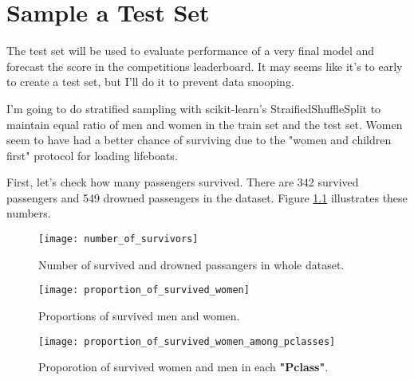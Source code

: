 \chapter{Sample a Test Set}
The test set will be used to evaluate performance of a very final model
and forecast the score in the competitions leaderboard. It may seems like
it's to early to create a test set, but I'll do it to prevent data snooping.

I'm going to do stratified sampling with scikit-learn's StraifiedShuffleSplit
to maintain equal ratio of men and women in the train set and the test set.
Women seem to have had a better chance of surviving due to the "women and
children first" protocol for loading lifeboats.

First, let's check how many passengers survived. There are 342 survived 
passengers and 549 drowned passengers in the dataset. Figure 
\ref{number_of_survivors} illustrates these numbers.

\begin{figure}[!ht]
	\centering
	\texttt{[image: number\_of\_survivors]}
	\caption{Number of survived and drowned passangers in whole dataset.}
	\label{number_of_survivors}
\end{figure}

\begin{figure}[!ht]
	\centering
	\texttt{[image: proportion\_of\_survived\_women]}
	\caption{Proportions of survived men and women.}
	\label{proportion_of_survived_women}
\end{figure}

\begin{figure}[!ht]
	\centering
	\texttt{[image: proportion\_of\_survived\_women\_among\_pclasses]}
	\caption{Proporotion of survived women and men in each \textbf{"Pclass"}.}
	\label{proportion_of_survived_women_among_pclasses}
\end{figure}